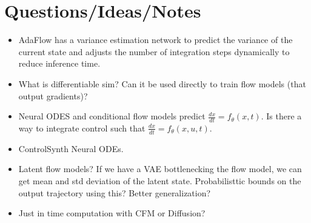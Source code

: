 \documentclass[12pt]{article}
\begin{document}
\section{Questions/Ideas/Notes}
\begin{itemize}
    \item AdaFlow has a variance estimation network to predict the variance of the current state and adjusts the number of integration steps dynamically to reduce inference time. 
    \item What is differentiable sim? Can it be used directly to train flow models (that output gradients)?
    \item Neural ODES and conditional flow models predict $\frac{dx}{dt} = f_{\theta}(x, t)$. Is there a way to integrate control such that $\frac{dx}{dt} = f_{\theta}(x, u, t)$.
    \item ControlSynth Neural ODEs. 
    \item Latent flow models? If we have a VAE bottlenecking the flow model, we can get mean and std deviation of the latent state. Probabilisttic bounds on the output trajectory using this? Better generalization?
    \item Just in time computation with CFM or Diffusion?
\end{itemize}
\end{document}
